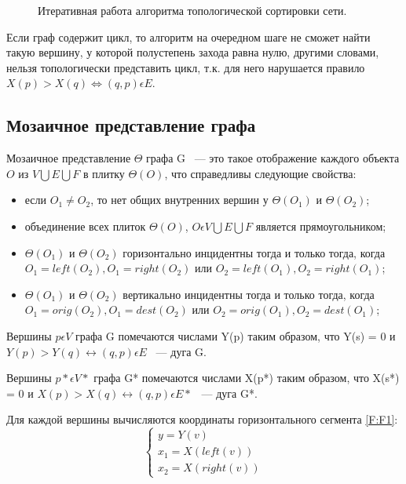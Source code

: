 \begin{figure}
\begin{minipage}[H]{0.99\linewidth}
	\end{minipage}
	\caption{Итеративная работа алгоритма топологической сортировки сети.}
	\label{fig:fig13}
\end{figure}

Если граф содержит цикл, то алгоритм на очередном шаге не сможет найти такую вершину, у которой полустепень захода равна нулю, другими словами, нельзя топологически представить цикл, т.к. для него нарушается правило $ X(p) > X(q) \Leftrightarrow (q, p) \epsilon E $.

\subsection{Мозаичное представление графа}

Мозаичное представление $ \Theta $ графа G ~--- это такое отображение каждого объекта $ O $ из $ V \bigcup E \bigcup F $ в плитку $ \Theta(O) $, что справедливы следующие свойства:
\begin{itemize}
\item если $ O_{1} \neq O_{2} $, то нет общих внутренних вершин у $ \Theta(O_{1}) $ и $ \Theta(O_{2}) $;
\item объединение всех плиток $ \Theta(O) $, $ O \epsilon V \bigcup E \bigcup F $ является прямоугольником;
\item $ \Theta(O_{1}) $ и $ \Theta(O_{2}) $ горизонтально инцидентны тогда и только тогда, когда $ O_{1} = left(O_{2}) , O_{1} = right(O_{2}) $ или $ O_{2} = left(O_{1}) , O_{2} = right(O_{1}) $;
\item $ \Theta(O_{1}) $ и $ \Theta(O_{2}) $ вертикально инцидентны тогда и только тогда, когда $ O_{1} = orig(O_{2}) , O_{1} = dest(O_{2}) $ или $ O_{2} = orig(O_{1}) , O_{2} = dest(O_{1}) $;
\end{itemize}

Вершины $ p \epsilon V $ графа G помечаются числами Y(p) таким образом, что Y(s) = 0 и $ Y(p) > Y(q) \leftrightarrow (q, p) \epsilon E $ ~--- дуга G.

Вершины $ p* \epsilon V* $ графа G* помечаются числами X(p*) таким образом, что X(s*) = 0 и $ X(p) > X(q) \leftrightarrow (q, p) \epsilon E* $ ~--- дуга G*.

Для каждой вершины вычисляются координаты горизонтального сегмента \ref{F:F1}:
\begin{equation}
	\begin{cases}
	y = Y(v) \\
	x_{1} = X(left(v)) \\
	x_{2} = X(right(v))
	\end{cases}
\label{F:F1}
\end{equation}

